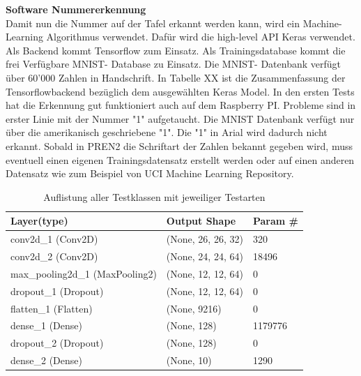 \documentclass[../../main.tex]{subfiles}
\begin{document}
    \textbf{Software Nummererkennung}\\
    Damit nun die Nummer auf der Tafel erkannt werden kann, wird ein Machine- Learning Algorithmus verwendet. Dafür wird die high-level API Keras verwendet. Als Backend kommt Tensorflow zum Einsatz. Als Trainingsdatabase kommt die frei Verfügbare MNIST- Database zu Einsatz. Die MNIST- Datenbank verfügt über 60'000 Zahlen in Handschrift. In Tabelle XX ist die Zusammenfassung der Tensorflowbackend bezüglich dem ausgewählten Keras Model. In den ersten Tests hat die Erkennung gut funktioniert auch auf dem Raspberry PI. Probleme sind in erster Linie mit der Nummer "1" aufgetaucht. Die MNIST Datenbank verfügt nur über die amerikanisch geschriebene "1". Die "1" in Arial wird dadurch nicht erkannt. Sobald in PREN2 die Schriftart der Zahlen bekannt gegeben wird, muss eventuell einen eigenen Trainingsdatensatz erstellt werden oder auf einen anderen Datensatz wie zum Beispiel von UCI Machine Learning Repository. 
    \begin{table}[H]
            \begin{center}
                \begin{tabular}{ | l | l | p{3cm} |}
                \hline
                \textbf{Layer(type)}  & \textbf{Output Shape} & \textbf{Param \#}\\\hline
                conv2d\_1 (Conv2D) & (None, 26, 26, 32) & 320 \\\hline
                conv2d\_2 (Conv2D) & (None, 24, 24, 64) & 18496 \\ \hline
                max\_pooling2d\_1 (MaxPooling2) & (None, 12, 12, 64) & 0\\ \hline
                dropout\_1 (Dropout) & (None, 12, 12, 64) & 0 \\ \hline
                flatten\_1 (Flatten) & (None, 9216) & 0 \\ \hline
                dense\_1 (Dense) & (None, 128) & 1179776 \\ \hline
                dropout\_2 (Dropout)  & (None, 128) & 0 \\ \hline
                dense\_2 (Dense)  & (None, 10) & 1290 \\ \hline
                \end{tabular}
            \end{center}
            \caption{Auflistung aller Testklassen mit jeweiliger Testarten}
            \label{tab:Testklassen}
        \end{table}
\end{document}
